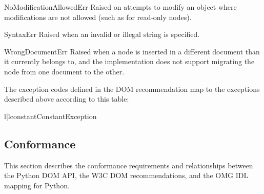 \begin{excdesc}{NoModificationAllowedErr}
  Raised on attempts to modify an object where modifications are not
  allowed (such as for read-only nodes).
\end{excdesc}

\begin{excdesc}{SyntaxErr}
  Raised when an invalid or illegal string is specified.
\end{excdesc}

\begin{excdesc}{WrongDocumentErr}
  Raised when a node is inserted in a different document than it
  currently belongs to, and the implementation does not support
  migrating the node from one document to the other.
\end{excdesc}

The exception codes defined in the DOM recommendation map to the
exceptions described above according to this table:

\begin{tableii}{l|l}{constant}{Constant}{Exception}
\end{tableii}


\subsection{Conformance \label{dom-conformance}}

This section describes the conformance requirements and relationships
between the Python DOM API, the W3C DOM recommendations, and the OMG
IDL mapping for Python.


